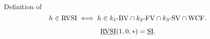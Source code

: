 \begin{frame}{Definition of \rvsi{}}
  \begin{equation*}
    h \in \text{RVSI}{} \iff h \in k_1\text{-BV}{} \cap k_2\text{-FV}{} \cap k_3\text{-SV}{} \cap \text{WCF}{}.
  \end{equation*}

  \vspace{0.50cm}
  \begin{theorem}
    \[
      \emph{\text{RVSI}}(1,0,\ast) = \emph{\text{SI}}.
    \]
  \end{theorem}
\end{frame}

\begin{frame}{}
\end{frame}

\begin{frame}{}
\end{frame}
